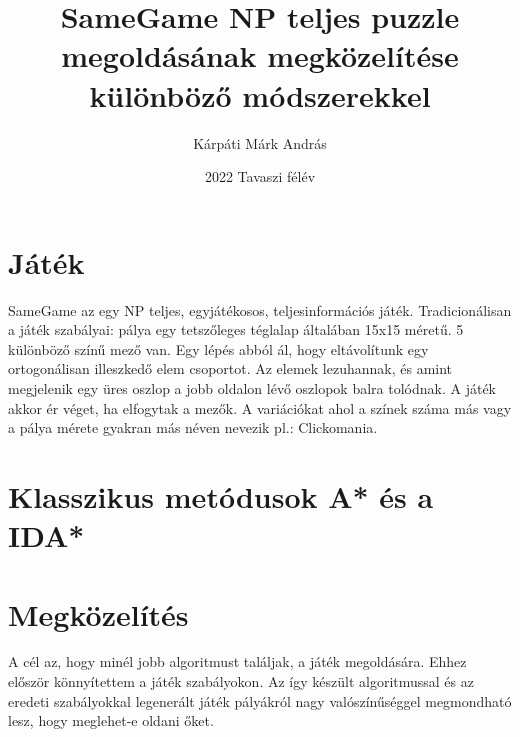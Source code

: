 \documentclass{article}
\title{SameGame NP teljes puzzle megoldásának megközelítése különböző módszerekkel}
\author{Kárpáti Márk András}
\date{2022 Tavaszi félév}
\begin{document}
	
	\maketitle
	
	
	\section{Játék}
	
	SameGame az egy NP teljes, egyjátékosos, teljesinformációs  játék. Tradicionálisan a játék szabályai: pálya egy tetszőleges téglalap általában 15x15 méretű. 5 különböző színű mező van. Egy lépés abból ál, hogy eltávolítunk egy ortogonálisan illeszkedő elem csoportot. Az elemek lezuhannak, és amint megjelenik egy üres oszlop a jobb oldalon lévő oszlopok balra tolódnak. A játék akkor ér véget, ha elfogytak a mezők. A variációkat ahol a színek száma más vagy a pálya mérete gyakran más néven nevezik pl.: Clickomania.
	
	\section{Klasszikus metódusok A* és a IDA*}
	
	
	
	\section{Megközelítés}
	
	A cél az, hogy minél jobb algoritmust találjak, a játék megoldására. Ehhez először könnyítettem a játék szabályokon. Az így készült algoritmussal és az eredeti szabályokkal legenerált játék pályákról nagy valószínűséggel megmondható lesz, hogy meglehet-e oldani őket.
	
	
	
\end{document}
